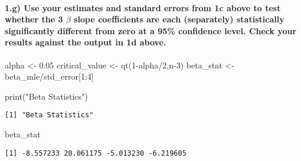 \documentclass[
  letterpaper,
  DIV=11,
  numbers=noendperiod]{scrartcl}
\let\oldparagraph\paragraph
\renewcommand{\paragraph}[1]{\oldparagraph{#1}\mbox{}}
\newenvironment{Shaded}{\begin{snugshade}}{\end{snugshade}}
\newcommand{\DecValTok}[1]{\textcolor[rgb]{0.68,0.00,0.00}{#1}}
\newcommand{\FloatTok}[1]{\textcolor[rgb]{0.68,0.00,0.00}{#1}}
\newcommand{\FunctionTok}[1]{\textcolor[rgb]{0.28,0.35,0.67}{#1}}
\newcommand{\NormalTok}[1]{\textcolor[rgb]{0.00,0.23,0.31}{#1}}
\newcommand{\OtherTok}[1]{\textcolor[rgb]{0.00,0.23,0.31}{#1}}
\newcommand{\SpecialCharTok}[1]{\textcolor[rgb]{0.37,0.37,0.37}{#1}}
\newcommand{\StringTok}[1]{\textcolor[rgb]{0.13,0.47,0.30}{#1}}
\begin{document}
\hypertarget{g-use-your-estimates-and-standard-errors-from-1c-above-to-test-whether-the-3-beta-slope-coefficients-are-each-separately-statistically-significantly-different-from-zero-at-a-95-confidence-level.-check-your-results-against-the-output-in-1d-above.}{%
\paragraph{\texorpdfstring{1.g) Use your estimates and standard errors
from 1c above to test whether the 3 \(\beta\) slope coefficients are
each (separately) statistically significantly different from zero at a
95\% confidence level. Check your results against the output in 1d
above.}{1.g) Use your estimates and standard errors from 1c above to test whether the 3 \textbackslash beta slope coefficients are each (separately) statistically significantly different from zero at a 95\% confidence level. Check your results against the output in 1d above.}}\label{g-use-your-estimates-and-standard-errors-from-1c-above-to-test-whether-the-3-beta-slope-coefficients-are-each-separately-statistically-significantly-different-from-zero-at-a-95-confidence-level.-check-your-results-against-the-output-in-1d-above.}}

\begin{Shaded}
\begin{Highlighting}[]
\NormalTok{alpha }\OtherTok{\textless{}{-}} \FloatTok{0.05}
\NormalTok{critical\_value }\OtherTok{\textless{}{-}} \FunctionTok{qt}\NormalTok{(}\DecValTok{1}\SpecialCharTok{{-}}\NormalTok{alpha}\SpecialCharTok{/}\DecValTok{2}\NormalTok{,n}\DecValTok{{-}3}\NormalTok{)}
\NormalTok{beta\_stat }\OtherTok{\textless{}{-}}\NormalTok{ beta\_mle}\SpecialCharTok{/}\NormalTok{std\_error[}\DecValTok{1}\SpecialCharTok{:}\DecValTok{4}\NormalTok{]}

\FunctionTok{print}\NormalTok{(}\StringTok{"Beta Statistics"}\NormalTok{)}
\end{Highlighting}
\end{Shaded}

\begin{verbatim}
[1] "Beta Statistics"
\end{verbatim}

\begin{Shaded}
\begin{Highlighting}[]
\NormalTok{beta\_stat}
\end{Highlighting}
\end{Shaded}

\begin{verbatim}
[1] -8.557233 20.061175 -5.013230 -6.219605
\end{verbatim}
\end{document}
